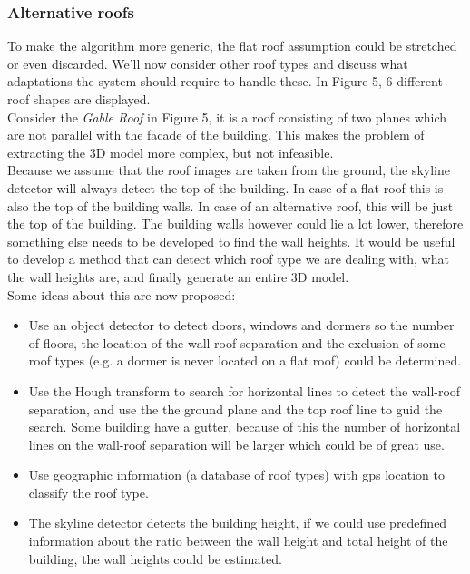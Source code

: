 \subsubsection{Alternative roofs}
To make the algorithm more generic, the flat roof assumption could be stretched
or even discarded.  We'll now consider other roof types and discuss what
adaptations the system should require to handle these.  In Figure 5,
6 different roof shapes are displayed.\\

Consider the \emph{Gable Roof} in Figure 5, it is a roof consisting of two planes
which are not parallel with the facade of the building. This makes the problem
of extracting the 3D model more complex, but not infeasible. \\
Because we assume that the roof images are taken from the ground, the skyline
detector will always detect the top of the building. In case of a flat roof
this is also the top of the building walls. In case of an
alternative roof, this will be just the top of the building. The building walls however
could lie a lot lower, therefore something else needs to be developed to find the wall
heights. It would be useful to develop a method that can detect which roof type we
are dealing with, what the wall heights are, and finally generate an entire 3D
model.\\
Some ideas about this are now proposed:\\
\begin{itemize}
	\item Use an object detector to detect doors, windows and dormers so the 
	number of floors, the location of the wall-roof separation and the exclusion of
	some roof types (e.g. a dormer is never located on a flat roof) could be determined.\\
	\item Use the Hough transform to search for horizontal lines to detect the
	wall-roof separation, and use the the ground plane and the top roof line to
	guid the search.  Some building have a gutter, because of this the number
	of horizontal lines on the wall-roof separation will be larger which could
	be of great use.\\
	\item Use geographic information (a database of roof types) with gps location
	to classify the roof type. \\
	\item The skyline detector detects the building height, if we
	could use predefined information about the ratio between the wall height and
	total height of the building, the wall heights could be estimated.\\
\end{itemize}
